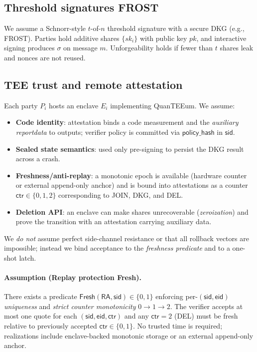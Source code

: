 \documentclass[runningheads,orivec]{llncs}
\newcommand{\prot}{\textsf{QuanTEEum}}
\newcommand{\FROST}{\textsf{FROST}}
\newcommand{\cFROST}{\FROST{}~\cite{komlo2020frost}}
\begin{document}
\subsection{Threshold signatures \cFROST{}}
We assume a Schnorr-style $t$-of-$n$ threshold signature with a secure DKG (e.g., \FROST{}). Parties hold additive shares $\{sk_i\}$ with public key $pk$, and interactive signing produces $\sigma$ on message $m$. Unforgeability holds if fewer than $t$ shares leak and nonces are not reused.

\subsection{TEE trust and remote attestation}
Each party $P_i$ hosts an enclave $E_i$ implementing \prot{}. We assume:
\begin{itemize}[leftmargin=*,itemsep=0.25em]
  \item \textbf{Code identity}: attestation binds a code measurement and the \emph{auxiliary reportdata} to outputs; verifier policy is committed via $\mathsf{policy\_hash}$ in $\mathsf{sid}$.
  \item \textbf{Sealed state semantics}: used only pre-signing to persist the DKG result across a crash.
  \item \textbf{Freshness/anti-replay}: a monotonic epoch is available (hardware counter or external append-only anchor) and is bound into attestations as a counter $\mathsf{ctr}\in\{0,1,2\}$ corresponding to JOIN, DKG, and DEL.
  \item \textbf{Deletion API}: an enclave can make shares unrecoverable (\emph{zeroization}) and prove the transition with an attestation carrying auxiliary data.
\end{itemize}
We \emph{do not} assume perfect side-channel resistance or that all rollback vectors are impossible; instead we bind acceptance to the \emph{freshness predicate} and to a one-shot latch.

\paragraph{Assumption (Replay protection \textsf{Fresh}).}
There exists a predicate $\textsf{Fresh}(\mathsf{RA},\mathsf{sid})\!\in\!\{0,1\}$ enforcing per-$(\mathsf{sid},\mathsf{eid})$ \emph{uniqueness} and \emph{strict counter monotonicity} $0\!\rightarrow\!1\!\rightarrow\!2$. The verifier accepts at most one quote for each $(\mathsf{sid},\mathsf{eid},\mathsf{ctr})$ and any $\mathsf{ctr}{=}2$ (DEL) must be fresh relative to previously accepted $\mathsf{ctr}\in\{0,1\}$. No trusted time is required; realizations include enclave-backed monotonic storage or an external append-only anchor.
\end{document}
